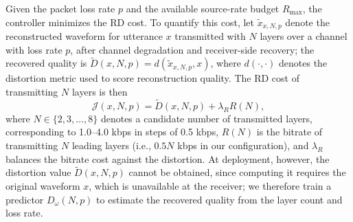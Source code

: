\documentclass[lettersize,journal]{IEEEtran}
\begin{document}
Given the packet loss rate $p$ and the available source-rate budget $R_{\max}$, the controller minimizes the RD cost. To quantify this cost, let $\widetilde{x}_{x,N,p}$ denote the reconstructed waveform for utterance $x$ transmitted with $N$ layers over a channel with loss rate $p$, after channel degradation and receiver-side recovery; the recovered quality is $\widetilde{D}(x,N,p)=d\!\left(\widetilde{x}_{x,N,p},x\right)$, where $d(\cdot,\cdot)$ denotes the distortion metric used to score reconstruction quality. The RD cost of transmitting $N$ layers is then
\begin{equation}
\mathcal{J}(x,N,p)=\widetilde{D}(x,N,p)+\lambda_R R(N),
\label{eq:jcost}
\end{equation}
where $N\in\{2,3,\ldots,8\}$ denotes a candidate number of transmitted layers, corresponding to 1.0--4.0 kbps in steps of 0.5 kbps, $R(N)$ is the bitrate of transmitting $N$ leading layers (i.e., $0.5N$ kbps in our configuration), and $\lambda_R$ balances the bitrate cost against the distortion. At deployment, however, the distortion value $\widetilde{D}(x,N,p)$ cannot be obtained, since computing it requires the original waveform $x$, which is unavailable at the receiver; we therefore train a predictor $D_\omega(N,p)$ to estimate the recovered quality from the layer count and loss rate.
\end{document}
